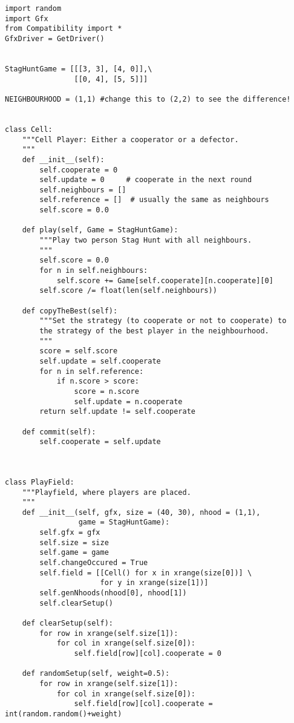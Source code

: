 \documentclass[12pt,a4paper,ngerman]{article}
\begin{document}
\begin{scriptsize}
\begin{verbatim}
import random
import Gfx
from Compatibility import *
GfxDriver = GetDriver()


StagHuntGame = [[[3, 3], [4, 0]],\
                [[0, 4], [5, 5]]]

NEIGHBOURHOOD = (1,1) #change this to (2,2) to see the difference!


class Cell:
    """Cell Player: Either a cooperator or a defector.
    """
    def __init__(self):
        self.cooperate = 0
        self.update = 0     # cooperate in the next round
        self.neighbours = []
        self.reference = []  # usually the same as neighbours
        self.score = 0.0

    def play(self, Game = StagHuntGame):
        """Play two person Stag Hunt with all neighbours.
        """
        self.score = 0.0
        for n in self.neighbours:
            self.score += Game[self.cooperate][n.cooperate][0]
        self.score /= float(len(self.neighbours))

    def copyTheBest(self):
        """Set the strategy (to cooperate or not to cooperate) to
        the strategy of the best player in the neighbourhood.
        """
        score = self.score
        self.update = self.cooperate
        for n in self.reference:
            if n.score > score:
                score = n.score
                self.update = n.cooperate
        return self.update != self.cooperate

    def commit(self):
        self.cooperate = self.update



class PlayField:
    """Playfield, where players are placed.
    """
    def __init__(self, gfx, size = (40, 30), nhood = (1,1),
                 game = StagHuntGame):
        self.gfx = gfx
        self.size = size
        self.game = game
        self.changeOccured = True
        self.field = [[Cell() for x in xrange(size[0])] \
                      for y in xrange(size[1])]
        self.genNhoods(nhood[0], nhood[1])
        self.clearSetup()

    def clearSetup(self):
        for row in xrange(self.size[1]):
            for col in xrange(self.size[0]):
                self.field[row][col].cooperate = 0        

    def randomSetup(self, weight=0.5):
        for row in xrange(self.size[1]):
            for col in xrange(self.size[0]):
                self.field[row][col].cooperate = int(random.random()+weight)


\end{verbatim}
\end{scriptsize}
\end{document}
